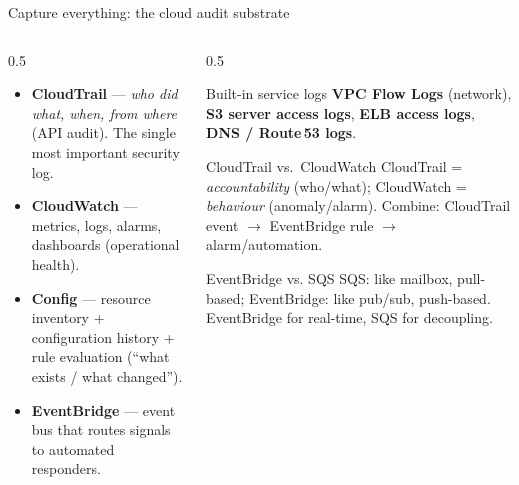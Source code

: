 \documentclass[aspectratio=169,10pt]{beamer}
\newcommand{\svc}[1]{{\color{accent}\textsf{\textbf{#1}}}}      %
\newcommand{\term}[1]{{\color{awsink}\textbf{#1}}}
\begin{document}
\begin{frame}{Capture everything: the cloud audit substrate}
  \begin{columns}[T]
    \begin{column}{0.5\textwidth}\small
      \begin{itemize}
        \item \svc{CloudTrail} --- \emph{who did what, when, from where} (API audit).
              The single most important security log.
        \item \svc{CloudWatch} --- metrics, logs, alarms, dashboards (operational health).
        \item \svc{Config} --- resource inventory + configuration history + rule evaluation
              (``what exists / what changed'').
        \item \svc{EventBridge} --- event bus that routes signals to automated responders.
      \end{itemize}
    \end{column}
    \begin{column}{0.5\textwidth}\small
      \begin{block}{\footnotesize Built-in service logs}
        \footnotesize \term{VPC Flow Logs} (network), \term{S3 server access logs},
        \term{ELB access logs}, \term{DNS / Route\,53 logs}.
      \end{block}
      \begin{block}{\footnotesize CloudTrail vs.\ CloudWatch}
        \footnotesize CloudTrail = \emph{accountability} (who/what); CloudWatch = \emph{behaviour}
        (anomaly/alarm). Combine: CloudTrail event $\to$ EventBridge rule $\to$ alarm/automation.
      \end{block}
      \begin{block}{\footnotesize EventBridge vs. SQS}
        \footnotesize SQS: like mailbox, pull-based; EventBridge: like pub/sub, push-based. EventBridge for real-time, SQS for decoupling.
      \end{block}
    \end{column}
  \end{columns}
\end{frame}
\end{document}
